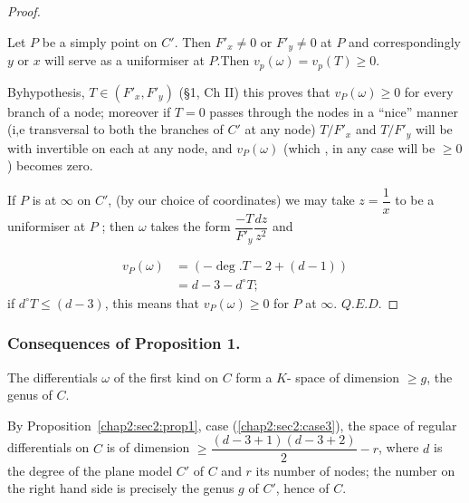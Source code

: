 \begin{proof}%
  \begin{case}\label{chap2:sec2:case1}
    Let $P$ be a simply point on $C'$. Then $ F'_x \neq 0$ or  $F'_y
    \neq 0 $ at $P$ and correspondingly $y$ or $x$ will serve as a
    uniformiser  at  $P$.Then $  v_p (\omega)= v_p (T) \geq 0$. 
  \end{case}
  \begin{case}\label{chap2:sec2:case2}
    By\pageoriginale hypothesis, $ T \in (F'_x ,F'_y)$ (\S 1,  Ch II) this proves
    that $v_P (\omega)\geq 0$ for every branch of a node; moreover if
    $T=0$ passes through the nodes in a ``nice'' manner (i,e
    transversal to both the  branches of $C'$ at any node) $ T/F'_x $
    and $T/F'_y $ will be with invertible  on each at  any node,  and
    $v_P (\omega)$ (which , in any case will be $\geq 0$) becomes
    zero. 
  \end{case}
  \begin{case}\label{chap2:sec2:case3}
    If $P$ is at $\infty$ on $ C'$, (by our choice of coordinates) we
    may take $z=\dfrac{1} {x}$ to be a uniformiser at $P$ ; then
    $\omega $ takes the form $\dfrac {-T} {F'_y} \dfrac {dz}{z^2}$ and 
  \end{case}
    \begin{align*}
      v_P(\omega) & = (-\deg.  T-2 + (d-1))\\
      & = d-3- d^\circ T;
    \end{align*}
    if $d^\circ T \leq (d-3)$, this means that  $v_P (\omega)
    \geq 0 $ for $P$ at $\infty$. \hfill{$ Q.E.D$.}
\end{proof}

\subsubsection*{Consequences of Proposition 1.}

\begin{corollary}\label{chap2:sec2:coro1}%
  The differentials $\omega$ of the first kind on $C$ form a $K$-
  space of dimension $\geq g$, the genus of $C$. 
\end{corollary}

By Proposition~\ref{chap2:sec2:prop1}, case (\ref{chap2:sec2:case3}), the space of regular differentials
on $C$ is of dimension $\geq \dfrac {(d-3+1) (d-3+2)} {2}-r$, where
$d$ is the degree of the plane model $C'$ of $C$  and $r$ its number
of nodes; the number on the right hand side is precisely the genus $g$
of $C'$, hence of $C$. 

